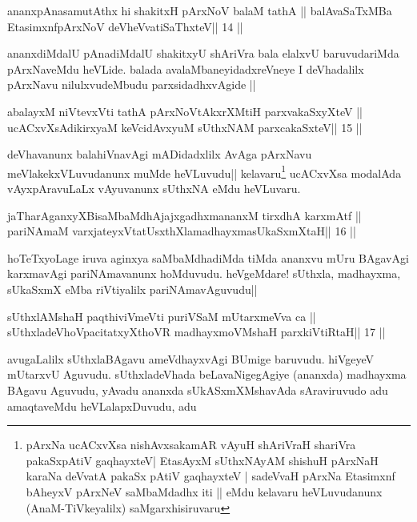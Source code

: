 
\begin{shl}
ananxpAnasamutAthx hi shakitxH pArxNoV balaM tathA ||
balAvaSaTxMBa EtasimxnfpArxNoV deVheV\s vatiSaThxteV\hfill || 14 ||
\end{shl}

\begin{artha}
ananxdiMdalU pAnadiMdalU shakitxyU shAriVra bala elalxvU baruvudariMda
pArxNaveMdu heVLide. balada avalaMbaneyidadxreVneye I deVhadalilx
pArxNavu nilulxvudeMbudu parxsidadhxvAgide ||
\end{artha}



\begin{shl}
abalayxM niVtevxVti tathA pArxNoVtAkxrXMtiH parxvakaSxyXteV ||
ucACxvXsAdikirxyaM keVcidAvxyuM sUthxNAM parxcakaSxteV\hfill || 15 ||
\end{shl}

\begin{artha}
deVhavanunx balahiVnavAgi mADidadxlilx AvAga pArxNavu
meVlakekxVLuvudanunx muMde heVLuvudu|| kelavaru\footnote{pArxNa
  ucACxvXsa nishAvxsakamAR vAyuH shAriVraH shariVra pakaSxpAtiV
  gaqhayxteV| EtasAyxM sUthxNAyAM shishuH pArxNaH karaNa deVvatA
  pakaSx pAtiV gaqhayxteV | sadeVvaH pArxNa Etasimxnf bAheyxV pArxNeV
  saMbaMdadhx iti || eMdu kelavaru heVLuvudanunx (AnaM-TiVkeyalilx) saMgarxhisiruvaru} ucACxvXsa modalAda
vAyxpAravuLaLx vAyuvanunx sUthxNA eMdu heVLuvaru.
\end{artha}

\begin{shl}
jaTharAganxyXBisaMbaMdhAjajxgadhxmananxM tirxdhA karxmAtf ||
pariNAmaM varxjateyxVtatUsxthXlamadhayxmasUkaSxmXtaH\hfill || 16 ||
\end{shl}

\begin{artha}
hoTeTxyoLage iruva aginxya saMbaMdhadiMda tiMda ananxvu mUru BAgavAgi
karxmavAgi pariNAmavanunx hoMduvudu. heVgeMdare! sUthxla, madhayxma,
sUkaSxmX eMba riVtiyalilx pariNAmavAguvudu|| 
\end{artha}

\begin{shl}
sUthxlAMshaH paqthiviVmeVti puriVSaM mUtarxmeVva ca ||
sUthxladeVhoVpacitatxyXthoVR madhayxmoVM\s shaH parxkiVtiRtaH\hfill || 17 ||
\end{shl}

\begin{artha}
avugaLalilx sUthxlaBAgavu ameVdhayxvAgi BUmige baruvudu. hiVgeyeV mUtarxvU
Aguvudu. sUthxladeVhada beLavaNigegAgiye (ananxda) madhayxma BAgavu
Aguvudu, yAvadu ananxda sUkASxmXMshavAda sAraviruvudo adu amaqtaveMdu
heVLalapxDuvudu, adu 
\end{artha}

